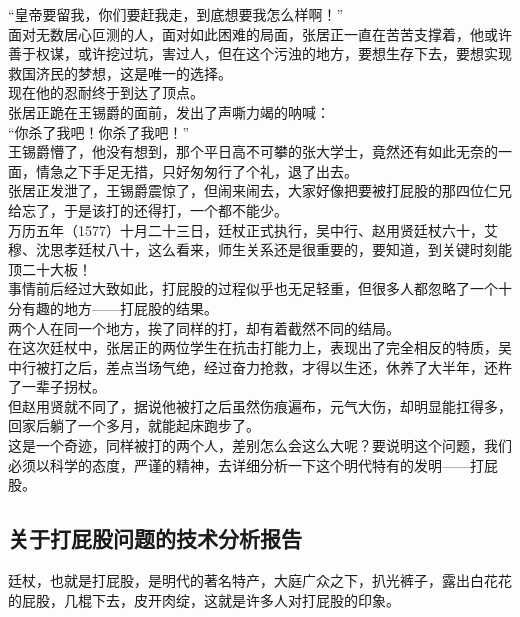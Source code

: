 \begin{multicols}{\theparacolNo}
“皇帝要留我，你们要赶我走，到底想要我怎么样啊！”\\

面对无数居心叵测的人，面对如此困难的局面，张居正一直在苦苦支撑着，他或许善于权谋，或许挖过坑，害过人，但在这个污浊的地方，要想生存下去，要想实现救国济民的梦想，这是唯一的选择。\\

现在他的忍耐终于到达了顶点。\\

张居正跪在王锡爵的面前，发出了声嘶力竭的呐喊：\\

“你杀了我吧！你杀了我吧！”\\

王锡爵懵了，他没有想到，那个平日高不可攀的张大学士，竟然还有如此无奈的一面，情急之下手足无措，只好匆匆行了个礼，退了出去。\\

张居正发泄了，王锡爵震惊了，但闹来闹去，大家好像把要被打屁股的那四位仁兄给忘了，于是该打的还得打，一个都不能少。\\

万历五年（1577）十月二十三日，廷杖正式执行，吴中行、赵用贤廷杖六十，艾穆、沈思孝廷杖八十，这么看来，师生关系还是很重要的，要知道，到关键时刻能顶二十大板！\\

事情前后经过大致如此，打屁股的过程似乎也无足轻重，但很多人都忽略了一个十分有趣的地方——打屁股的结果。\\

两个人在同一个地方，挨了同样的打，却有着截然不同的结局。\\

在这次廷杖中，张居正的两位学生在抗击打能力上，表现出了完全相反的特质，吴中行被打之后，差点当场气绝，经过奋力抢救，才得以生还，休养了大半年，还杵了一辈子拐杖。\\

但赵用贤就不同了，据说他被打之后虽然伤痕遍布，元气大伤，却明显能扛得多，回家后躺了一个多月，就能起床跑步了。\\

这是一个奇迹，同样被打的两个人，差别怎么会这么大呢？要说明这个问题，我们必须以科学的态度，严谨的精神，去详细分析一下这个明代特有的发明——打屁股。\\

\subsection{关于打屁股问题的技术分析报告}
廷杖，也就是打屁股，是明代的著名特产，大庭广众之下，扒光裤子，露出白花花的屁股，几棍下去，皮开肉绽，这就是许多人对打屁股的印象。\\


\end{multicols}
